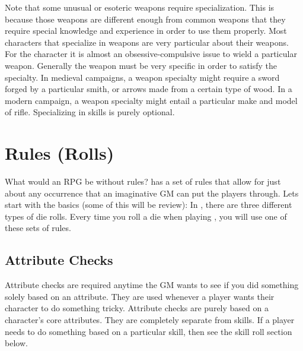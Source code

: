 \documentclass[twoside]{book}
\begin{document}
  

   Note that some unusual or esoteric weapons require
                 specialization. This is because those weapons are
                 different enough from common weapons that they require
                 special knowledge and experience in order to use them
                 properly.  Most characters that specialize in weapons are
                 very particular about their weapons. For the character
                 it is almost an obsessive-compulsive issue to wield a
                 particular weapon. Generally the weapon must be very
                 specific in order to satisfy the specialty. In medieval
                 campaigns, a weapon specialty might require a sword
                 forged by a particular smith, or arrows made from a
                 certain type of wood. In a modern campaign, a weapon
                 specialty might entail a particular make and model of
                 rifle.  Specializing in skills is purely optional. 
    

\section{Rules (Rolls)}
     What would an RPG be without rules? \APATHY{}  has a
            set of rules that allow for just about any occurrence that an
            imaginative GM can put the players through.
           Lets start with the basics (some of this will be
             review):  In \APATHY{}, there are three different types of die
            rolls. Every time you roll a die when playing \APATHY{},
            you will use one of these sets of rules.
          
    

\subsection{Attribute Checks}
     Attribute checks are required anytime the GM wants
               to see if you did something solely based on an attribute.
               They are used whenever a player wants their character to
               do something tricky. Attribute checks are purely based on
               a character's core attributes. They are completely
               separate from skills. If a player needs to do something
               based on a particular skill, then see the skill roll
               section below. 
  
\end{document}
